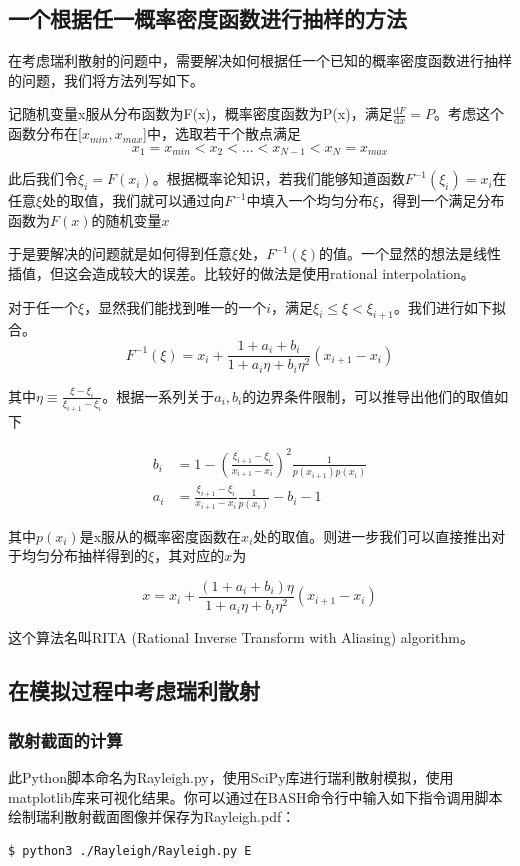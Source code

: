 \documentclass[12pt,a4paper]{article}%
\begin{document}
    \subsection{一个根据任一概率密度函数进行抽样的方法}
    在考虑瑞利散射的问题中，需要解决如何根据任一个已知的概率密度函数进行抽样的问题，我们将方法列写如下。\par
    记随机变量x服从分布函数为F(x)，概率密度函数为P(x)，满足$\frac{\mathrm dF}{\mathrm dx}=P$。考虑这个函数分布在[$x_{min},x_{max}$]中，选取若干个散点满足
    $$
    x_1=x_{min}<x_2<\dots<x_{N-1}<x_{N}=x_{max}
    $$\par
    此后我们令$\xi_i = F(x_i)$。根据概率论知识，若我们能够知道函数$F^{-1}(\xi_i)= x_i$在任意$\xi$处的取值，我们就可以通过向$F^{-1}$中填入一个均匀分布$\xi$，得到一个满足分布函数为$F(x)$的随机变量$x$\par
    于是要解决的问题就是如何得到任意$\xi$处，$F^{-1}(\xi)$的值。一个显然的想法是线性插值，但这会造成较大的误差。比较好的做法是使用rational interpolation。\par
    对于任一个$\xi$，显然我们能找到唯一的一个$i$，满足$\xi_i\leq \xi < \xi_{i+1}$。我们进行如下拟合。
    $$
    F^{-1}(\xi) = x_i + \frac{1+a_i+b_i}{1+a_i\eta+b_i\eta^2}(x_{i+1}-x_i)
    $$\par
    其中$\eta \equiv \frac{\xi - \xi_{i}}{\xi_{i+1}-\xi_{i}}$。根据一系列关于$a_i,b_i$的边界条件限制，可以推导出他们的取值如下\par
    \begin{align}
    b_i &= 1 - \left(\frac{\xi_{i+1}-\xi_{i}}{x_{i+1}-x_{i}}\right)^2\frac{1}{p(x_{i+1})p(x_i)} \\
    a_i &= \frac{\xi_{i+1}-\xi_{i}}{x_{i+1}-x_{i}}\frac{1}{p(x_i)}-b_i-1
    \end{align}\par
    其中$p(x_i)$是x服从的概率密度函数在$x_i$处的取值。则进一步我们可以直接推出对于均匀分布抽样得到的$\xi$，其对应的$x$为\par
    $$
    x = x_i + \frac{(1+a_i+b_i)\eta}{1+ a_i\eta + b_i\eta^2}(x_{i+1}-x_i)
    $$\par
    这个算法名叫RITA (Rational Inverse Transform with Aliasing) algorithm。
    \subsection{在模拟过程中考虑瑞利散射\cite{penelope2006workshop} } 
    \subsubsection{散射截面的计算}
        此Python脚本命名为Rayleigh.py，使用SciPy库进行瑞利散射模拟，使用matplotlib库来可视化结果。你可以通过在BASH命令行中输入如下指令调用脚本绘制瑞利散射截面图像并保存为Rayleigh.pdf：    
    \begin{lstlisting}[style=mystyle,label=code:bash]
    $ python3 ./Rayleigh/Rayleigh.py E
    \end{lstlisting}
    
\end{document}
